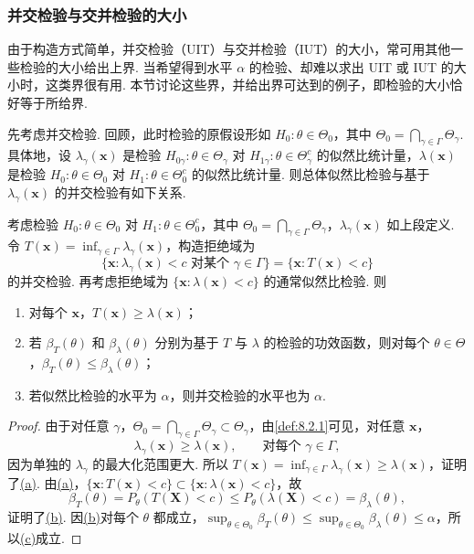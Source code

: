 \subsubsection{并交检验与交并检验的大小}\label{sec:8.3.3}
由于构造方式简单，并交检验（UIT）与交并检验（IUT）的大小，常可用其他一些检验的大小给出上界. 当希望得到水平 $\alpha$ 的检验、却难以求出 UIT 或 IUT 的大小时，这类界很有用.
本节讨论这些界，并给出界可达到的例子，即检验的大小恰好等于所给界.

先考虑并交检验. 回顾，此时检验的原假设形如 $H_0:\theta\in\Theta_0$，其中 $\Theta_0=\bigcap_{\gamma\in\Gamma}\Theta_\gamma$. 具体地，设 $\lambda_\gamma(\boldsymbol x)$ 是检验 $H_{0\gamma}:\theta\in\Theta_\gamma$ 对 $H_{1\gamma}:\theta\in\Theta_\gamma^c$ 的似然比统计量，$\lambda(\boldsymbol x)$ 是检验 $H_0:\theta\in\Theta_0$ 对 $H_1:\theta\in\Theta_0^c$ 的似然比统计量. 则总体似然比检验与基于 $\lambda_\gamma(\boldsymbol x)$ 的并交检验有如下关系.
\begin{theorem}\label{thm:8.3.21}
考虑检验 $H_0:\theta\in\Theta_0$ 对 $H_1:\theta\in\Theta_0^c$，其中 $\Theta_0=\bigcap_{\gamma\in\Gamma}\Theta_\gamma$，$\lambda_\gamma(\boldsymbol x)$ 如上段定义. 令 $T(\boldsymbol x)=\inf_{\gamma\in\Gamma}\lambda_\gamma(\boldsymbol x)$，构造拒绝域为
$$\{\boldsymbol x:\lambda_\gamma(\boldsymbol x)<c\text{ 对某个 }\gamma\in\Gamma\}
=\{\boldsymbol x:T(\boldsymbol x)<c\}$$
的并交检验. 再考虑拒绝域为 $\{\boldsymbol x:\lambda(\boldsymbol x)<c\}$ 的通常似然比检验. 则
\begin{enumerate}
\item{}\label{itm:thm:8.3.21:a} 对每个 $\boldsymbol x$，$T(\boldsymbol x)\ge\lambda(\boldsymbol x)$；
\item{}\label{itm:thm:8.3.21:b} 若 $\beta_T(\theta)$ 和 $\beta_\lambda(\theta)$ 分别为基于 $T$ 与 $\lambda$ 的检验的功效函数，则对每个 $\theta\in\Theta$，$\beta_T(\theta)\le\beta_\lambda(\theta)$；
\item{}\label{itm:thm:8.3.21:c} 若似然比检验的水平为 $\alpha$，则并交检验的水平也为 $\alpha$.
\end{enumerate}
\end{theorem}
\begin{proof}
由于对任意 $\gamma$，$\Theta_0=\bigcap_{\gamma\in\Gamma}\Theta_\gamma\subset\Theta_\gamma$，由\autoref{def:8.2.1}可见，对任意 $\boldsymbol x$，
$$\lambda_\gamma(\boldsymbol x)\ge\lambda(\boldsymbol x),\qquad\text{对每个 }\gamma\in\Gamma,$$
因为单独的 $\lambda_\gamma$ 的最大化范围更大. 所以 $T(\boldsymbol x)=\inf_{\gamma\in\Gamma}\lambda_\gamma(\boldsymbol x)\ge\lambda(\boldsymbol x)$，证明了\hyperref[itm:thm:8.3.21:a]{(a)}. 由\hyperref[itm:thm:8.3.21:a]{(a)}，$\{\boldsymbol x:T(\boldsymbol x)<c\}\subset\{\boldsymbol x:\lambda(\boldsymbol x)<c\}$，故
$$\beta_T(\theta)=P_\theta(T(\boldsymbol X)<c)\le P_\theta(\lambda(\boldsymbol X)<c)=\beta_\lambda(\theta),$$
证明了\hyperref[itm:thm:8.3.21:b]{(b)}. 因\hyperref[itm:thm:8.3.21:b]{(b)}对每个 $\theta$ 都成立，$\sup_{\theta\in\Theta_0}\beta_T(\theta)\le\sup_{\theta\in\Theta_0}\beta_\lambda(\theta)\le\alpha$，所以\hyperref[itm:thm:8.3.21:c]{(c)}成立.
\end{proof}
